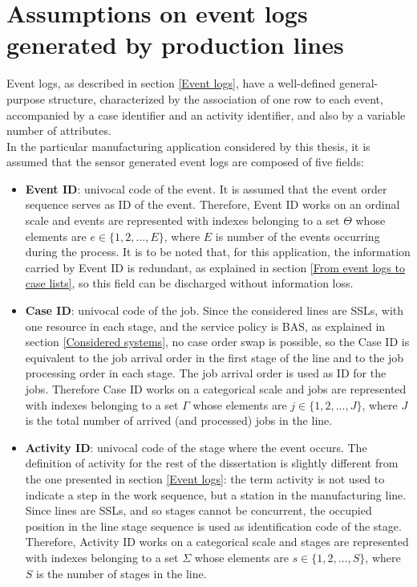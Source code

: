 \section{Assumptions on event logs generated by production lines}
Event logs, as described in section \ref{Event logs}, have a well-defined general-purpose structure, characterized by the association of one row to each event, accompanied by a case identifier and an activity identifier, and also by a variable number of attributes. \\In the particular manufacturing application considered by this thesis, it is assumed that the sensor generated event logs are composed of five fields:
\begin{itemize}
\item \textbf{Event ID}: univocal code of the event. It is assumed that the event order sequence serves as ID of the event. Therefore, Event ID works on an ordinal scale and events are represented with indexes belonging to a set $\Theta$ whose elements are $e\in\{1,2,...,E\}$, where $E$ is number of the events occurring during the process. It is to be noted that, for this application, the information carried by Event ID is redundant, as explained in section \ref{From event logs to case lists}, so this field can be discharged without information loss. 
\item \textbf{Case ID}: univocal code of the job. Since the considered lines are SSLs, with one resource in each stage, and the service policy is BAS, as explained in section \ref{Considered systems}, no case order swap is possible, so the Case ID is equivalent to the job arrival order in the first stage of the line and to the job processing order in each stage. The job arrival order is used as ID for the jobs. Therefore Case ID works on a categorical scale and jobs are represented with indexes belonging to a set $\Gamma$ whose elements are $j\in\{1,2,...,J\}$, where $J$ is the total number of arrived (and processed) jobs in the line. 
\item \textbf{Activity ID}: univocal code of the stage where the event occurs. The definition of activity for the rest of the dissertation is slightly different from the one presented in section \ref{Event logs}: the term activity is not used to indicate a step in the work sequence, but a station in the manufacturing line. Since lines are SSLs, and so stages cannot be concurrent, the occupied position in the line stage sequence is used as identification code of the stage. Therefore, Activity ID works on a categorical scale and stages are represented with indexes belonging to a set $\Sigma$ whose elements are $s\in\{1,2,...,S\}$, where $S$ is the number of stages in the line. 

\end{itemize}
